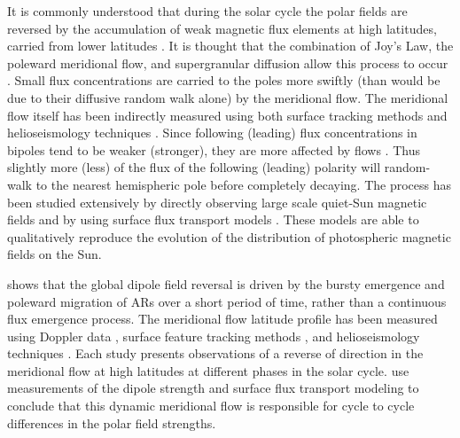 It is commonly understood that during the solar cycle the polar fields are reversed by the accumulation of weak magnetic flux elements at high latitudes, carried from lower latitudes \citep{Babcock:1961, Leighton:1964}. It is thought that the combination of Joy's Law, the poleward meridional flow, and supergranular diffusion allow this process to occur \citep{Mosher:1977}. Small flux concentrations are carried to the poles more swiftly (than would be due to their diffusive random walk alone) by the meridional flow. The meridional flow itself has been indirectly measured using both surface tracking methods and helioseismology techniques \citep{Hathaway:2010,Haber:2002,Zhao:2004}. Since following (leading) flux concentrations in bipoles tend to be weaker (stronger), they are more affected by flows \citep{Schrijver:1996}. Thus slightly more (less) of the flux of the following (leading) polarity will random-walk to the nearest hemispheric pole before completely decaying. The process has been studied extensively by directly observing large scale quiet-Sun magnetic fields \citep{Harvey:1992,Ulrich:2005,Schrijver:2008b} and by using surface flux transport models \citep{Leighton:1964,Wang:1989,Schrijver:2003}. These models are able to qualitatively reproduce the evolution of the distribution of photospheric magnetic fields on the Sun. 

\citet{Ulrich:2002} shows that the global dipole field reversal is driven by the bursty emergence and poleward migration of ARs over a short period of time, rather than a continuous flux emergence process. The meridional flow latitude profile has been measured using Doppler data \citep{Ulrich:2005}, surface feature tracking methods \citep{Hathaway:2010}, and helioseismology techniques \citep{Haber:2002,Zhao:2004}. Each study presents observations of a reverse of direction in the meridional flow at high latitudes at different phases in the solar cycle. \citet{Schrijver:2008b} use measurements of the dipole strength and surface flux transport modeling to conclude that this dynamic meridional flow is responsible for cycle to cycle differences in the polar field strengths.


